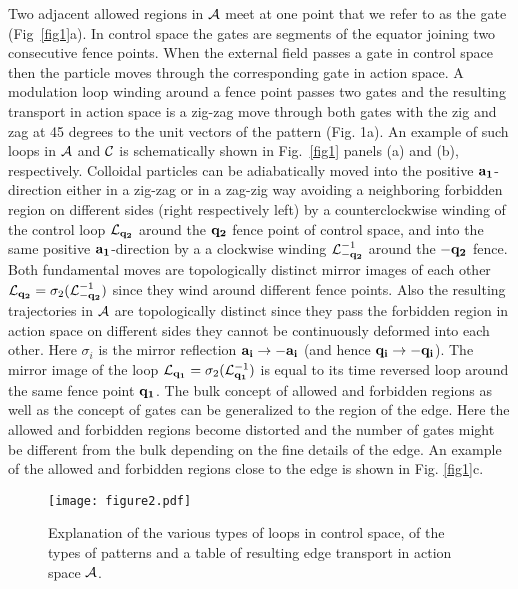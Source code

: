 \documentclass[12pt]{iopart}
\begin{document}
Two adjacent allowed regions in ${\cal A}$ meet at one point that we refer to as the gate (Fig~\ref{fig1}a). In control space the gates are
segments of the equator joining two consecutive fence points. When the external field passes a gate in control space then
the particle moves through the corresponding gate in action space. A modulation loop winding around a fence point passes two gates and the resulting
transport in action space is a zig-zag move through both gates with the zig and zag at 45 degrees to the unit vectors of the pattern (Fig. 1a). 
An example of such loops in ${\cal A}$ and ${\cal C}$ is schematically shown in Fig.~\ref{fig1} panels (a) and (b), respectively.
Colloidal particles can be adiabatically moved into the positive $\bf {a}_1$-direction 
either in a zig-zag or in a zag-zig way avoiding a neighboring forbidden region on different sides (right respectively left)
by a counterclockwise winding of the control loop ${\cal L}_{\bf q_2}$ around the $\bf q_2$ fence point of control space, and
into the same positive $\bf {a}_1$-direction by a 
a clockwise winding  ${\cal L}_{-\bf q_2}^{-1}$ around the $-\bf q_2$
fence. Both fundamental moves are topologically distinct mirror images of each other
${\cal L}_{\bf q_2}=\sigma_2({\cal L}_{-\bf q_2}^{-1})$ since they wind around different fence points. Also the resulting trajectories in $\cal A$ are topologically distinct since they pass the
forbidden region in action space on different sides they cannot be continuously deformed into each other. Here $\sigma_i$ is the mirror
reflection $\bf a_i\to -\bf a_i$  (and hence $\bf q_i\to -\bf q_i$).
The mirror image of the loop ${\cal L}_{\bf q_1}=\sigma_2({\cal L}_{\bf q_1}^{-1})$ is equal to its time reversed loop around the same fence point $\bf q_1$. The bulk concept of allowed and forbidden regions as well as the concept of gates can
be generalized to the region of the edge. Here the allowed and forbidden regions become distorted and the number of gates
might be different from the bulk depending on the fine details of the edge.  An example of the allowed and forbidden regions
close to the edge is shown in Fig. \ref{fig1}c.


\begin{figure}
	\texttt{[image: figure2.pdf]}
	\caption{Explanation of the various types of loops in control space, of the types of patterns and a table of resulting edge transport in action space ${\cal A}$.}\label{definitions}
\end{figure}
\end{document}
